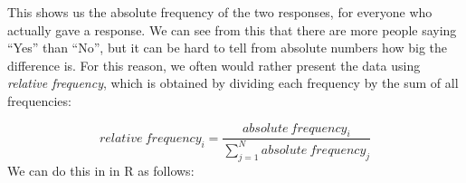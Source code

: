 \documentclass[]{book}
\newenvironment{Shaded}{\begin{snugshade}}{\end{snugshade}}
\newcommand{\KeywordTok}[1]{\textcolor[rgb]{0.13,0.29,0.53}{\textbf{#1}}}
\newcommand{\DataTypeTok}[1]{\textcolor[rgb]{0.13,0.29,0.53}{#1}}
\newcommand{\StringTok}[1]{\textcolor[rgb]{0.31,0.60,0.02}{#1}}
\newcommand{\CommentTok}[1]{\textcolor[rgb]{0.56,0.35,0.01}{\textit{#1}}}
\newcommand{\OperatorTok}[1]{\textcolor[rgb]{0.81,0.36,0.00}{\textbf{#1}}}
\newcommand{\NormalTok}[1]{#1}
\theoremstyle{definition}
\theoremstyle{definition}
\theoremstyle{definition}
\theoremstyle{remark}
\begin{document}
This shows us the absolute frequency of the two responses, for everyone
who actually gave a response. We can see from this that there are more
people saying ``Yes'' than ``No'', but it can be hard to tell from
absolute numbers how big the difference is. For this reason, we often
would rather present the data using \emph{relative frequency}, which is
obtained by dividing each frequency by the sum of all frequencies:

\[
relative\ frequency_i = \frac{absolute\ frequency_i}{\sum_{j=1}^N absolute\ frequency_j}
\] We can do this in in R as follows:

\begin{Shaded}
\end{Shaded}
\end{document}
